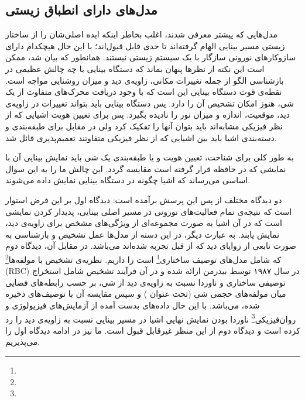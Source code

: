 \subsection{مدل‌های دارای انطباق زیستی}
مدل‌هایی که پیشتر معرفی شدند، اغلب بخاطر اینکه ایده اصلی‌شان را از ساختار زیستی مسیر بینایی الهام گرفته‌اند تا حدی قابل قبول‌اند؛ با این حال هیچکدام دارای سازوکارهای نورونی سازگار با یک سیستم زیستی نیستند. 
همانطور که بیان شد، ممکن است این نکته از نظرها پنهان بماند که دستگاه بینایی با چه چالش عظیمی در بازشناسی الگو از جمله تغییرات مکانی، زاویه‌ی دید و میزان روشنایی مواجه است. نقطه‌ی قوت دستگاه بینایی این است که با وجود دریافت محرک‌های متفاوت از یک شی، هنوز امکان تشخیص آن را دارد. پس دستگاه بینایی باید بتواند تغییرات در زاویه‌ی دید، موقعیت، اندازه و میزان نور را نادیده بگیرد. پس برای تعیین هویت اشیایی که از نظر فیزیکی مشابه‌اند باید بتوان آنها را تفکیک کرد ولی در مقابل برای طبقه‌بندی و دسته‌بندی اشیا باید بین اشیایی که از نظر فیزیکی متفاوتند تعمیم‌پذیری قائل شد.

به طور کلی برای شناخت، تعیین هویت و یا طبقه‌بندی یک شی باید نمایش بینایی آن با نمایشی که در حافظه قرار گرفته است مقایسه گردد. این چالش ما را به این سوال اساسی می‌رساند که اشیا چگونه در دستگاه بینایی نمایش داده می‌شوند.

دو دیدگاه مختلف از پس این پرسش برآمده است: دیدگاه اول بر این فرض استوار است که نتیجه‌ی تمام فعالیت‌های نورونی در مسیر اصلی بینایی، پدیدار کردن نمایشی است که در آن اشیا به صورت مجموعه‌ای از ویژگی‌های مشخص برای زاویه‌ی دید، نمایش یابند. به عبارت دیگر، در این دسته از مدل‌ها عمل تشخیص و بازشناسی به صورت تابعی از زوایای دید که از قبل تجربه شده‌اند می‌باشد. در مقابل آن، دیدگاه دوم که شامل مدل‌های توصیف ساختاری\footnote{} است را داریم. نظریه‌ی تشخیص با مولفه‌ها\footnote{} (RBC) در سال ۱۹۸۷ توسط بیدرمن ارائه شده\cite{biederman1987recognition} و در آن فرآیند تشخیص شامل استخراج توصیفی ساختاری و ناوردا نسبت به زاویه‌ی دید از شی، بر حسب رابطه‌های فضایی میان مولفه‌های حجمی شی (تحت عنوان ) و سپس مقایسه آن با توصیف‌های ذخیره شده، می‌باشد. با این حال داده‌های بدست آمده از آزمایش‌های فیزیولوژی و روان‌فیزیکی\footnote{} ناوردا بودن نمایش نهایی اشیا در مسیر بینایی نسبت به زاویه‌ی دید را رد کرده است و دیدگاه دوم از این منظر غیرقابل قبول است. ما نیز در ادامه دیدگاه اول را می‌پذیریم.